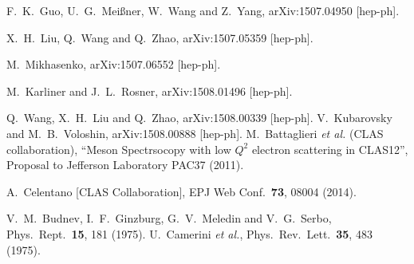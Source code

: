 \documentclass[a4paper,10pt]{article}
\begin{document}
\begin{thebibliography}{9}
  F.~K.~Guo, U.~G.~Meißner, W.~Wang and Z.~Yang,
  arXiv:1507.04950 [hep-ph].

  X.~H.~Liu, Q.~Wang and Q.~Zhao,
  arXiv:1507.05359 [hep-ph].

  M.~Mikhasenko,
  arXiv:1507.06552 [hep-ph].


  M.~Karliner and J.~L.~Rosner,
  arXiv:1508.01496 [hep-ph].

  Q.~Wang, X.~H.~Liu and Q.~Zhao,
  arXiv:1508.00339 [hep-ph].
  V.~Kubarovsky and M.~B.~Voloshin,
  arXiv:1508.00888 [hep-ph].
M.~Battaglieri\textit{ et al.} (CLAS collaboration),
``Meson Spectrsocopy with low $Q^2$ electron scattering in CLAS12'',
Proposal to Jefferson Laboratory PAC37 (2011).


  A.~Celentano [CLAS Collaboration],
  EPJ Web Conf.\  {\bf 73}, 08004 (2014).

  V.~M.~Budnev, I.~F.~Ginzburg, G.~V.~Meledin and V.~G.~Serbo,
  Phys.\ Rept.\  {\bf 15}, 181 (1975).
  U.~Camerini {\it et al.},
  Phys.\ Rev.\ Lett.\  {\bf 35}, 483 (1975).


\end{thebibliography}
\end{document}
